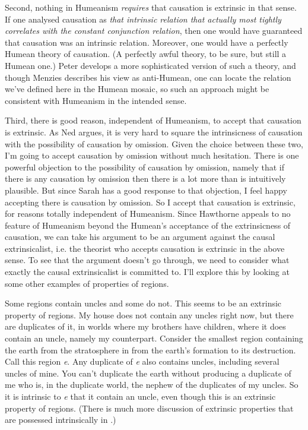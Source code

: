 Second, nothing in Humeanism \textit{requires} that causation is extrinsic in that sense. If one analysed causation as \textit{that intrinsic relation that actually most tightly correlates with the constant conjunction relation}, then one would have guaranteed that causation was an intrinsic relation. Moreover, one would have a perfectly Humean theory of causation. (A perfectly awful theory, to be sure, but still a Humean one.) Peter \citet{Menzies1996, Menzies1999} develops a more sophisticated version of such a theory, and though Menzies describes his view as anti-Humean, one can locate the relation we've defined here in the Humean mosaic, so such an approach might be consistent with Humeanism in the intended sense.

Third, there is good reason, independent of Humeanism, to accept that causation is extrinsic. As Ned \citet{Hall2004} argues, it is very hard to square the intrinsicness of causation with the possibility of causation by omission. Given the choice between these two, I'm going to accept causation by omission without much hesitation. There is one powerful objection to the possibility of causation by omission, namely that if there is any causation by omission then there is a lot more than is intuitively plausible. But since Sarah \citet{McGrath2005} has a good response to that objection, I feel happy accepting there is causation by omission. So I accept that causation is extrinsic, for reasons totally independent of Humeanism. Since Hawthorne appeals to no feature of Humeanism beyond the Humean's acceptance of the extrinsicness of causation, we can take his argument to be an argument against the causal extrinsicalist, i.e. the theorist who accepts causation is extrinsic in the above sense. To see that the argument doesn't go through, we need to consider what exactly the causal extrinsicalist is committed to. I'll explore this by looking at some other examples of properties of regions.

Some regions contain uncles and some do not. This seems to be an extrinsic property of regions. My house does not contain any uncles right now, but there are duplicates of it, in worlds where my brothers have children, where it does contain an uncle, namely my counterpart. Consider the smallest region containing the earth from the stratosphere in from the earth's formation to its destruction. Call this region \textit{e}. Any duplicate of \textit{e} also contains uncles, including several uncles of mine. You can't duplicate the earth without producing a duplicate of me who is, in the duplicate world, the nephew of the duplicates of my uncles. So it is intrinsic to \textit{e} that it contain an uncle, even though this is an extrinsic property of regions. (There is much more discussion of extrinsic properties that are possessed intrinsically in \citet{Humberstone1996}.)

